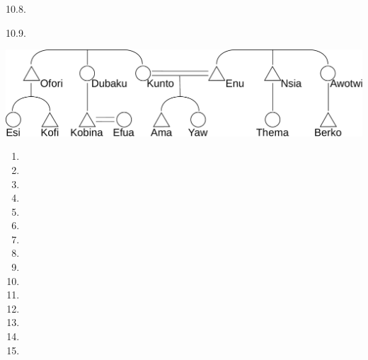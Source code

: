 \begin{refsection}
\begin{practiceproblemsolution}{10.8. \langnameAralle}
\end{practiceproblemsolution}


\begin{practiceproblemsolution}{10.9. \langnameAkan}

\begin{solutions}[label=Solution 10.9\alph*]
    \item \quad

    \noindent\includegraphics[width = \linewidth]{figures/akan_solutions.pdf}
    \item
    \begin{multicols}{2}
        \begin{enumerate}[leftmargin = 2em, label = (\arabic*)]
            \item {}
            \item {}
            \item {}
            \item {}
            \item {}
            \item {}
            \item {}
            \item {}
            \item {}
            \item {}
            \item {}
            \item {}
            \item {}
            \item {}
            \item {}
        \end{enumerate}
    \end{multicols}
\end{solutions}


\end{practiceproblemsolution}
\end{refsection}
